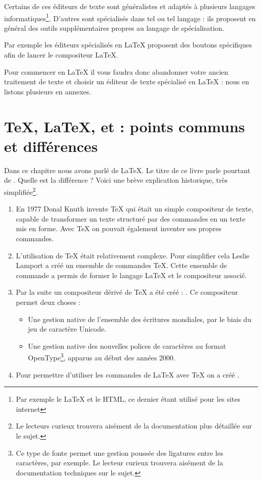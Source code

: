 Certains de ces éditeurs de texte sont généralistes et adaptés à plusieurs langages informatiques\footnote{Par exemple le \LaTeX{} et le HTML, ce dernier étant utilisé pour les sites internet}. D'autres sont spécialisés dans tel ou tel langage : ils proposent en général des outils supplémentaires propres au langage de spécialisation. 

Par exemple les éditeurs spécialisés en \LaTeX{} proposent des boutons spécifiques afin de lancer le compositeur \LaTeX{}.

Pour commencer en \LaTeX{} il vous faudra donc abandonner votre ancien traitement de texte et choisir un éditeur de texte spécialisé en \LaTeX{} : nous en listons plusieurs en annexes.

\section[TeX, LaTeX, XeTeX, XeLaTeX : points communs et différences]{\TeX{}, \LaTeX{}, \XeTeX{} et \XeLaTeX{} : points communs et différences}

Dans ce chapitre nous avons parlé de \LaTeX{}. Le titre de ce livre parle pourtant  de \XeLaTeX{}. Quelle est la différence ? Voici une brève explication historique, très simplifiée\footnote{Le lecteurs curieux trouvera aisément de la documentation plus détaillée sur le sujet.}.

\begin{enumerate}
\item En 1977 Donal Knuth invente  \TeX{} qui était un simple compositeur de texte, capable de transformer un texte structuré par des commandes en un texte mis en forme. Avec \TeX{} on pouvait également inventer ses propres commandes.
\item L'utilisation de \TeX{} était relativement complexe. Pour simplifier cela Leslie Lamport a créé un ensemble de commandes \TeX{}. Cette ensemble de commande a permis de former le langage \LaTeX{} et le compositeur associé.
\item Par la suite un compositeur dérivé de \TeX{} a été créé : \XeTeX{}. Ce compositeur permet deux choses :
\begin{itemize}
	\item Une gestion native de l'ensemble des écritures mondiales, par le biais du jeu de caractère Unicode.
	\item Une gestion native des nouvelles polices de caractères au format OpenType\footnote{Ce type de fonte permet une gestion poussée des ligatures entre les caractères, par exemple. Le lecteur curieux trouvera aisément de la documentation techniques sur le sujet.}, apparus au début des années 2000.

\end{itemize} 
\item Pour permettre d'utiliser les commandes de \LaTeX{} avec \TeX{} on a créé \XeLaTeX{}.
\end{enumerate}

